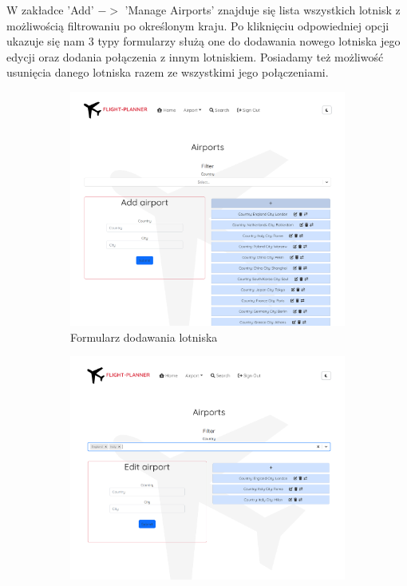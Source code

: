 \documentclass[12pt]{article}
\begin{document}
W zakładce 'Add' $->$ 'Manage Airports' znajduje się lista wszystkich lotnisk z możliwością filtrowaniu po określonym kraju. Po kliknięciu odpowiedniej opcji ukazuje się nam 3 typy formularzy służą one do dodawania nowego lotniska jego edycji oraz dodania połączenia z innym lotniskiem. Posiadamy też możliwość usunięcia danego lotniska razem ze wszystkimi jego połączeniami.\\
\begin{figure}[!ht]
    \centering
    \begin{subfigure}{.95\textwidth}
        \centering
        \includegraphics[width=0.7\linewidth]{4} 
        \caption{Formularz dodawania lotniska}
    \end{subfigure}
    \newline
    \begin{subfigure}{.45\textwidth}
        \centering
        \includegraphics[width=0.95\linewidth]{5}  

\end{subfigure}
\end{figure}
\end{document}
